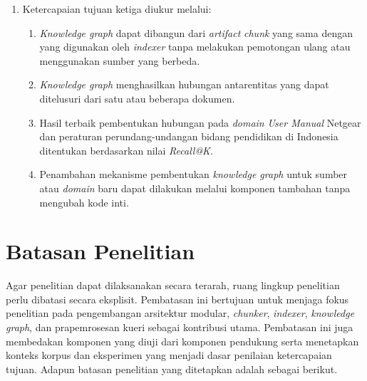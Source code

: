 \begin{enumerate}
    \item Ketercapaian tujuan ketiga diukur melalui:
    \begin{enumerate}[label=\alph*.]
        \item \emph{Knowledge graph} dapat dibangun dari \emph{artifact} \emph{chunk} yang sama dengan yang digunakan oleh \emph{indexer} tanpa melakukan pemotongan ulang atau menggunakan sumber yang berbeda.
        \item \emph{Knowledge graph} menghasilkan hubungan antarentitas yang dapat ditelusuri dari satu atau beberapa dokumen.
        \item Hasil terbaik pembentukan hubungan pada \emph{domain} \emph{User Manual} Netgear dan peraturan perundang-undangan bidang pendidikan di Indonesia ditentukan berdasarkan nilai \emph{Recall@K}.
        \item Penambahan mekanisme pembentukan \emph{knowledge graph} untuk sumber atau \emph{domain} baru dapat dilakukan melalui komponen tambahan tanpa mengubah kode inti.
    \end{enumerate}
\end{enumerate}

\section{Batasan Penelitian}

Agar penelitian dapat dilaksanakan secara terarah, ruang lingkup penelitian perlu
dibatasi secara eksplisit. Pembatasan ini bertujuan untuk menjaga fokus penelitian
pada pengembangan arsitektur modular, \emph{chunker}, \emph{indexer},
\emph{knowledge graph}, dan prapemrosesan kueri sebagai kontribusi utama.
Pembatasan ini juga membedakan komponen yang diuji dari komponen pendukung
serta menetapkan konteks korpus dan eksperimen yang menjadi dasar penilaian
ketercapaian tujuan. Adapun batasan penelitian yang ditetapkan adalah sebagai
berikut.

